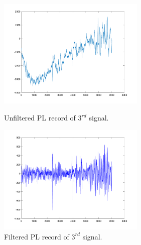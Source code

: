 \documentclass[a4paper,11pt]{article}
\begin{document}
\begin{figure}[ht!]
    \begin{minipage}{0.5\textwidth}
        \centering
        \includegraphics[width=70mm]{PL_sig3.png}
        \caption{Unfiltered PL record of $3^{rd}$ signal.}
    \end{minipage}\hfill
    \begin{minipage}{0.5\textwidth}
        \centering
        \includegraphics[width=70mm]{PL_sig3_filtered.png}
        \caption{Filtered PL record of $3^{rd}$ signal.}
    \end{minipage}\hfill
\end{figure}
\end{document}
